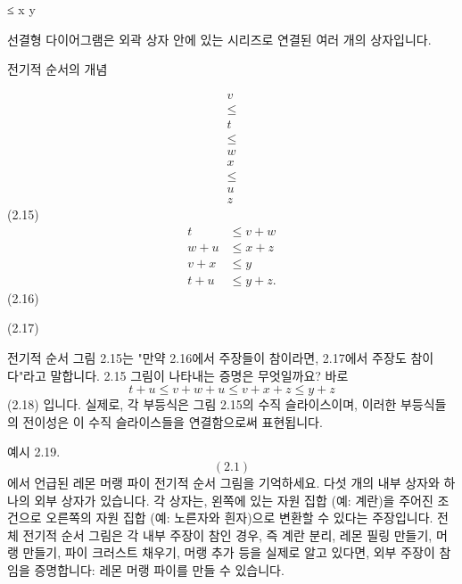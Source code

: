 \documentclass[11pt, a4paper, twoside, openany]{book}
\begin{document}
{\par\medskip
≤
x
y

\par\medskip
선결형 다이어그램은 외곽 상자 안에 있는 시리즈로 연결된 여러 개의 상자입니다.

\par\medskip
전기적 순서의 개념

\par\medskip
$$
\begin{array}{c}
v \\
\leq \\
t \\
\leq \\
w \\
x \\
\leq \\
u \\
z
\end{array}
$$ (2.15)
 $$
\begin{aligned}
t &\leq v + w \\
w + u &\leq x + z \\
v + x &\leq y \\
t + u &\leq y + z .
\end{aligned}
$$ (2.16)

\par\medskip
(2.17)

\par\medskip
전기적 순서 그림 2.15\hspace{0pt}는 "만약 2.16\hspace{0pt}에서 주장들이 참이라면, 2.17\hspace{0pt}에서 주장도 참이다"라고 말합니다. 2.15 그림이 나타내는 증명은 무엇일까요? 바로  $$t + u \leq v + w + u \leq v + x + z \leq y + z $$ (2.18) 입니다. 실제로, 각 부등식은 그림 2.15\hspace{0pt}의 수직 슬라이스이며, 이러한 부등식들의 전이성은 이 수직 슬라이스들을 연결함으로써 표현됩니다.

\par\medskip
예시 2.19.  $$( 2.1 ) $$ 에서 언급된 레몬 머랭 파이 전기적 순서 그림을 기억하세요. 다섯 개의 내부 상자와 하나의 외부 상자가 있습니다. 각 상자는, 왼쪽에 있는 자원 집합 (예: 계란)을 주어진 조건으로 오른쪽의 자원 집합 (예: 노른자와 흰자)으로 변환할 수 있다는 주장입니다. 전체 전기적 순서 그림은 각 내부 주장이 참인 경우, 즉 계란 분리, 레몬 필링 만들기, 머랭 만들기, 파이 크러스트 채우기, 머랭 추가 등을 실제로 알고 있다면, 외부 주장이 참임을 증명합니다: 레몬 머랭 파이를 만들 수 있습니다.

}
\end{document}
